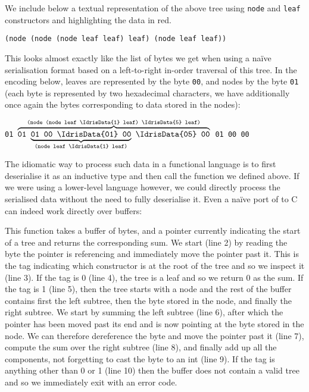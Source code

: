 We include below a textual representation of the above tree using
\texttt{node} and \texttt{leaf} constructors and highlighting the
data in red.

\begin{center}
  \usestt
  \texttt{(node (node (node leaf  leaf)  leaf)  (node leaf  leaf))}
\end{center}

This looks almost exactly like the list of bytes we get when using a
naïve serialisation format based on a left-to-right in-order traversal
of this tree.
%
In the encoding below,
leaves are represented by the byte \texttt{00},
and nodes by the byte \texttt{01}
(each byte is represented by two hexadecimal characters,
we have additionally once again  the bytes
corresponding to data stored in the nodes):

\begin{center}
  \usestt
      \texttt{01 $\overbrace{\texttt{01 $\underbrace{\texttt{01 00 \IdrisData{01} 00}}_{\texttt{(node leaf \IdrisData{1} leaf)}}$
    \IdrisData{05} 00}}^{\texttt{(node (node leaf \IdrisData{1} leaf) \IdrisData{5} leaf)}}$
     01 00  00}
\end{center}

The idiomatic way to process such data in a functional language
is to first deserialise it as an inductive type and then call
the  function we defined above.
%
If we were using a lower-level language however, we could directly
process the serialised data without the need to fully deserialise it.
%
Even a naïve port of  to C can indeed work
directly over buffers:

{\usestt }

This function takes a buffer of bytes, and
a pointer currently indicating the start of a tree
and returns the corresponding sum.
%
We start (line 2) by reading the byte the pointer is referencing and
immediately move the pointer past it.
%
This is the tag indicating which constructor is at the root of the tree
and so we inspect it (line 3).
%
If the tag is 0 (line 4), the tree is a leaf and so we return $0$ as the sum.
%
If the tag is 1 (line 5), then the tree starts with a node and the rest
of the buffer contains
first the left subtree,
then the byte stored in the node,
and finally the right subtree.
%
We start by summing the left subtree (line 6),
after which the pointer has been moved past its end and is now pointing
at the byte stored in the node.
We can therefore dereference the byte and move the pointer past it (line 7),
compute the sum over the right subtree (line 8),
and finally add up all the components, not forgetting to cast the byte to an int (line 9).
%
If the tag is anything other than 0 or 1 (line 10) then the buffer does not
contain a valid tree and so we immediately exit with an error code.

